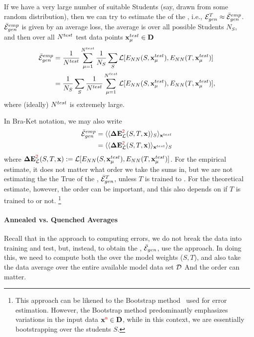 If we have a very large number of suitable Students
(say, drawn from some random distribution), then we can try to estimate the 
\AverageGeneralizationError of the \Teacher, i.e., ${\mathcal{E}}_{gen}^{T}\approx\bar{\mathcal{E}}^{emp}_{gen}$.
$\bar{\mathcal{E}}^{emp}_{gen}$ is given by an average loss, the average is 
over all possible Students $N_S$,  and then  over all  $N^{test}$ test data points $\mathbf{x}_{\mu}^{test}\in\mathbf{D}$ 
\begin{align}
  \bar{\mathcal{E}}^{emp}_{gen}
  &=
  \frac{1}{N^{test}}\sum_{\mu=1}^{N^{test}}
  \frac{1}{N_S}\sum_{S}
  \mathcal{L}[E_{NN}(S,\mathbf{x}_{\mu}^{test}),E_{NN}(T,\mathbf{x}_{\mu}^{test})]  \\ \nonumber
    &=
  \frac{1}{N_S}\sum_{S}
    \frac{1}{N^{test}}\sum_{\mu=1}^{N^{test}}
    \mathcal{L}[E_{NN}(S,\mathbf{x}_{\mu}^{test}),E_{NN}(T,\mathbf{x}_{\mu}^{test})] ,
\label{eqn:emp_gen_error}
\end{align}
where (ideally) $N^{test}$ is extremely large.

In Bra-Ket notation, we may also write
\begin{align}
  \bar{\mathcal{E}}^{emp}_{gen}
  &= \langle \langle \mathbf{\Delta {E}}^{{\color{red}\sf{2}}}_{\mathcal{L}}(S,T,\mathbf{x}) \rangle_{S} \rangle_{\mathbf{x}^{test}}\\ \nonumber
  &= \langle \langle \mathbf{\Delta {E}}^{{\color{red}\sf{2}}}_{\mathcal{L}}(S,T,\mathbf{x}) \rangle_{\mathbf{x}^{test}} \rangle_{S}
\end{align}
where $\mathbf{\Delta {E}}^{{\color{red}\sf{2}}}_{\mathcal{L}}(S,T,\mathbf{x}):=\mathcal{L}[E_{NN}(S,\mathbf{x}_{\mu}^{test}),E_{NN}(T,\mathbf{x}_{\mu}^{test})]$.
For the empirical estimate, it does not matter what order we take the sums in,
but we are not estimating the
the True \AverageGeneralizationError  of the \Teacher, $\bar{\mathcal{E}}_{gen}^{T}$,
unless $T$ is trained to \Interpolation.
For the theoretical estimate, however, the order can be important, and this also depends on
if $T$ is trained to \Interpolation or not.
\footnote{This approach can be likened to the Bootstrap method~\cite{efron1993bootstrap} used for error estimation.  However, the Bootstrap method predominantly emphasizes variations in the input data $\mathbf{x}^{{\color{red}\sf{n}}}\in\mathbf{D}$, while in this context, we are essentially bootstrapping over the students $S$.}


\paragraph{Annealed vs. Quenched Averages}
Recall that in the \STATMECH approach to computing errors, we do not break the data into
training and test, but, instead, to obtain the \AverageGeneralizationError, $\bar{\mathcal{E}}_{gen}$, use
the \GeneratingFunction approach. In doing this, we need to compute both the \ThermalAverage
over the model weights ($S,T$), and also take the data average over the entire available model data set $\mathcal{D}$
And the order can matter.

